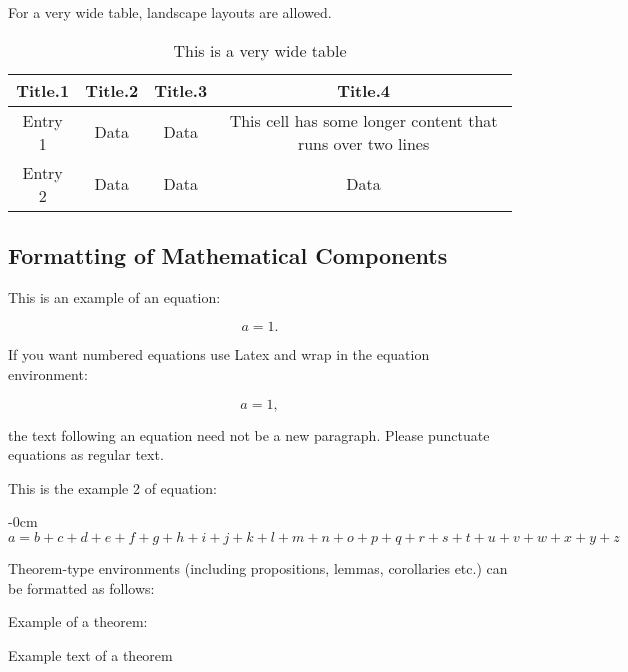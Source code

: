 \documentclass[atmosphere,article,submit,moreauthors,pdftex]{Definitions/mdpi}
\begin{document}
For a very wide table, landscape layouts are allowed.

\begin{table}[H]

\caption{\label{tab:tab2}This is a very wide table}
\begin{tabular}[t]{cccc}
\toprule
Title.1 & Title.2 & Title.3 & Title.4\\
\midrule
Entry 1 & Data & Data & This cell has some longer content that runs over
                               two lines\\
Entry 2 & Data & Data & Data\\
\bottomrule
\end{tabular}
\end{table}

\finishlandscape

\subsection{Formatting of Mathematical
Components}\label{formatting-of-mathematical-components}

This is an example of an equation:

\[
a = 1.
\]

If you want numbered equations use Latex and wrap in the equation
environment:

\begin{equation}
a = 1,
\end{equation}

the text following an equation need not be a new paragraph. Please
punctuate equations as regular text.

This is the example 2 of equation:

\begin{adjustwidth}{-\extralength}{0cm}
\begin{equation}
a = b + c + d + e + f + g + h + i + j + k + l + m + n + o + p + q + r + s + t + 
u + v + w + x + y + z
\end{equation}
\end{adjustwidth}

Theorem-type environments (including propositions, lemmas, corollaries
etc.) can be formatted as follows:

Example of a theorem:

\begin{Theorem}
Example text of a theorem

\end{Theorem}
\end{document}
